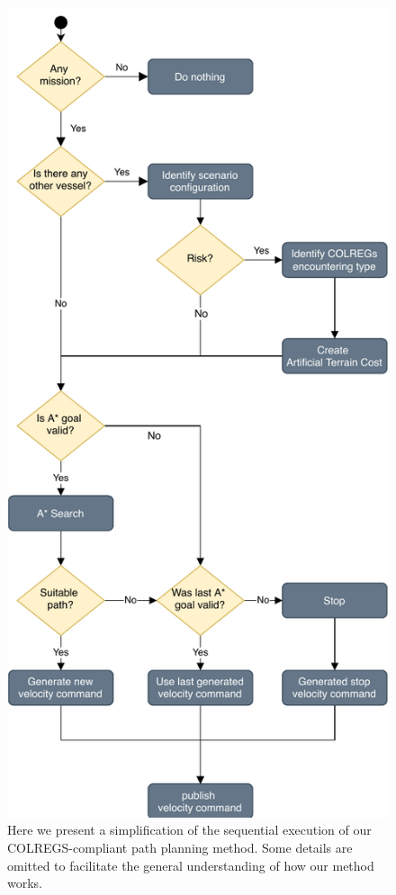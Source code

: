         \begin{figure}[H]
            \centering
            \includegraphics[scale=0.75]{figs/Chap4/AStartwithATC_flowChart.pdf}
            \caption{Here we present a simplification of the sequential execution of our COLREGS-compliant path planning method. Some details are omitted to facilitate the general understanding of how our method works.}
            \label{fig:gnc_arch}
        \end{figure}

